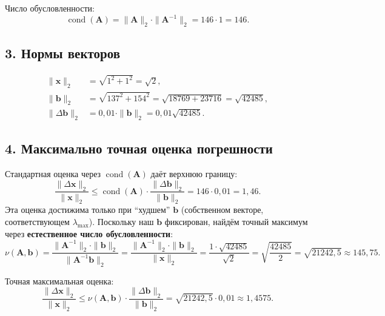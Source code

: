 \documentclass{article}
\begin{document}
Число обусловленности:
\begin{equation}
\operatorname{cond}(\mathbf{A}) = \|\mathbf{A}\|_2 \cdot \|\mathbf{A}^{-1}\|_2 = 146 \cdot 1 = 146.
\end{equation}

\subsection*{3. Нормы векторов}

\begin{align}
\|\mathbf{x}\|_2 &= \sqrt{1^2 + 1^2} = \sqrt{2}, \\
\|\mathbf{b}\|_2 &= \sqrt{137^2 + 154^2} = \sqrt{18769 + 23716} = \sqrt{42485}, \\
\|\Delta\mathbf{b}\|_2 &= 0{,}01 \cdot \|\mathbf{b}\|_2 = 0{,}01\sqrt{42485}.
\end{align}

\subsection*{4. Максимально точная оценка погрешности}

Стандартная оценка через $\operatorname{cond}(\mathbf{A})$ даёт верхнюю границу:
\begin{equation}
\frac{\|\Delta\mathbf{x}\|_2}{\|\mathbf{x}\|_2} \leqslant \operatorname{cond}(\mathbf{A}) \cdot \frac{\|\Delta\mathbf{b}\|_2}{\|\mathbf{b}\|_2} = 146 \cdot 0{,}01 = 1{,}46.
\end{equation}
Эта оценка достижима только при ``худшем'' $\mathbf{b}$ (собственном векторе, соответствующем $\lambda_{\max}$). Поскольку наш $\mathbf{b}$ фиксирован, найдём точный максимум через \textbf{естественное число обусловленности}:
\begin{equation}
\nu(\mathbf{A}, \mathbf{b}) = \frac{\|\mathbf{A}^{-1}\|_2 \cdot \|\mathbf{b}\|_2}{\|\mathbf{A}^{-1}\mathbf{b}\|_2} = \frac{\|\mathbf{A}^{-1}\|_2 \cdot \|\mathbf{b}\|_2}{\|\mathbf{x}\|_2} = \frac{1 \cdot \sqrt{42485}}{\sqrt{2}} = \sqrt{\frac{42485}{2}} = \sqrt{21242{,}5} \approx 145{,}75.
\end{equation}

Точная максимальная оценка:
\begin{equation}
\frac{\|\Delta\mathbf{x}\|_2}{\|\mathbf{x}\|_2} \leqslant \nu(\mathbf{A}, \mathbf{b}) \cdot \frac{\|\Delta\mathbf{b}\|_2}{\|\mathbf{b}\|_2} = \sqrt{21242{,}5} \cdot 0{,}01 \approx 1{,}4575.
\end{equation}
\end{document}
